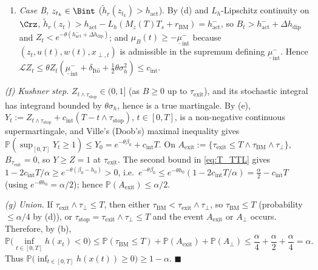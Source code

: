 \begin{enumerate}
    \item \emph{Case B, \(z_{t_k} \in \Bint\)} (\(\tilde h_r(z_{t_k}) > h_{\mathrm{act}}\)). By (d) and \(L_h\)-Lipschitz continuity on \(\Crz\), \(\tilde h_r(z_t) > h_{\mathrm{act}} - L_h(M_z(T)T_s + r_{\mathrm{BM}}) = h_{\mathrm{act}}^-\), so \(B_t > h_{\mathrm{act}}^- + \Delta h_{\mathrm{dip}}\) and \(Z_t < e^{-\theta(h^-_{\mathrm{act}} + \Delta h_{\mathrm{dip}})}\); and \(\mu_B(t) \ge -\underline\mu^-_{\mathrm{int}}\) because \((z_t, u(t), w(t), x_{\perp,t})\) is admissible in the supremum defining \(\underline\mu^-_{\mathrm{int}}\). Hence \(\mathcal{L}Z_t \le \theta Z_t(\underline\mu^-_{\mathrm{int}} + \delta_{\mathrm{It\hat o}} + \frac12\theta\sigma_h^2) \le c_{\mathrm{int}}\).
\end{enumerate}
\emph{(f) Kushner step.} \(Z_{t\wedge\tau_{\mathrm{stop}}} \in (0,1]\) (as \(B \ge 0\) up to \(\tau_{\mathrm{exit}}\)), and its stochastic integral has integrand bounded by \(\theta\sigma_h\), hence is a true martingale. By (e), \(Y_t := Z_{t\wedge\tau_{\mathrm{stop}}} + c_{\mathrm{int}}(T - t\wedge\tau_{\mathrm{stop}})\), \(t \in [0,T]\), is a non-negative continuous supermartingale, and Ville's (Doob's) maximal inequality gives \(\mathbb{P}(\sup_{[0,T]}Y_t \ge 1) \le Y_0 = e^{-\theta\beta_0} + c_{\mathrm{int}}T\). On \(A_{\mathrm{exit}} := \{\tau_{\mathrm{exit}} \le T\wedge\tau_{\mathrm{BM}}\wedge\tau_\perp\}\), \(B_{\tau_{\mathrm{exit}}} = 0\), so \(Y \ge Z = 1\) at \(\tau_{\mathrm{exit}}\). The second bound in \eqref{eq:T_TTL} gives \(1 - 2c_{\mathrm{int}}T/\alpha \ge e^{-\theta(\beta_0 - h_0)} > 0\), i.e.\ \(e^{-\theta\beta_0} \le e^{-\theta h_0}(1 - 2c_{\mathrm{int}}T/\alpha) = \frac{\alpha}{2} - c_{\mathrm{int}}T\) (using \(e^{-\theta h_0} = \alpha/2\)); hence \(\mathbb{P}(A_{\mathrm{exit}}) \le \alpha/2\).

\emph{(g) Union.} If \(\tau_{\mathrm{exit}}\wedge\tau_\perp \le T\), then either \(\tau_{\mathrm{BM}} < \tau_{\mathrm{exit}}\wedge\tau_\perp\), so \(\tau_{\mathrm{BM}} \le T\) (probability \(\le \alpha/4\) by (d)), or \(\tau_{\mathrm{stop}} = \tau_{\mathrm{exit}}\wedge\tau_\perp \le T\) and the event \(A_{\mathrm{exit}}\) or \(A_\perp\) occurs. Therefore, by (b),
\[
\mathbb{P}\Big(\inf_{t \in [0,T]} h(x_t) < 0\Big) \le \mathbb{P}(\tau_{\mathrm{BM}} \le T) + \mathbb{P}(A_{\mathrm{exit}}) + \mathbb{P}(A_\perp) \le \frac{\alpha}{4} + \frac{\alpha}{2} + \frac{\alpha}{4} = \alpha .
\]
Thus \(\mathbb{P}\big(\inf_{t \in [0, T]} h(x(t)) \ge 0\big) \ge 1 - \alpha\). \hfill \(\blacksquare\)
